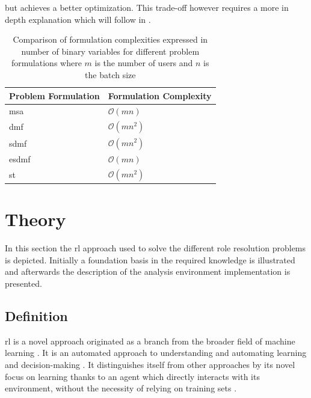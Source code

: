  but achieves a better optimization. This trade-off however requires a more in depth explanation which will follow in .

\begin{table}[!ht]
	\centering
		\begin{tabular}{@{}ll@{}}
		\toprule
		Problem Formulation & Formulation Complexity \\ \midrule
		\gls{msa}    & $\mathcal{O}(mn)$           \\
		\gls{dmf}   & $\mathcal{O}(mn^2)$         \\
		\gls{sdmf}  & $\mathcal{O}(mn^2)$         \\
		\gls{esdmf}  & $\mathcal{O}(mn)$           \\
		\gls{st} 	   & $\mathcal{O}(mn^2)$ \\	\bottomrule
		\end{tabular}
	\caption{Comparison of formulation complexities expressed in number of binary variables for different problem formulations where $m$ is the number of users and $n$ is the batch size}
	\label{tab:big_oh_formulations}
\end{table}

\section{ Theory}
\label{sec:rl_theory}

In this section the \gls{rl} approach used to solve the different role resolution problems is depicted. Initially a foundation basis in the required knowledge is illustrated and afterwards the description of the analysis environment implementation is presented.

\subsection{ Definition}

\gls{rl} is a novel approach originated as a branch from the broader field of machine learning \citep{Sutton2017}. It is an automated approach to understanding and automating learning and decision-making \citep[p. 15]{Sutton2017}. It distinguishes itself from other approaches by its novel focus on learning thanks to an agent which directly interacts with its environment, without the necessity of relying on training sets \citep[p. 15]{Sutton2017}.

